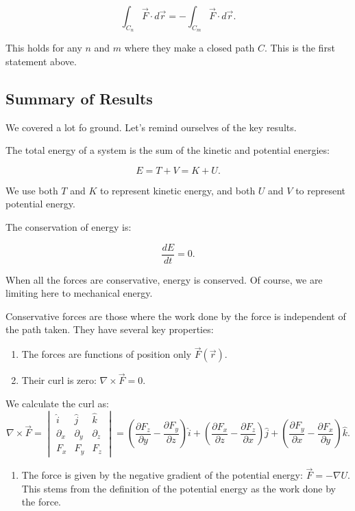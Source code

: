 \documentclass[11pt]{article}
\providecommand{\tightlist}{%
      \setlength{\itemsep}{0pt}\setlength{\parskip}{0pt}}
\begin{document}
\[\int_{C_n} \vec{F}\cdot d\vec{r} = -\int_{C_m} \vec{F}\cdot d\vec{r}.\]

This holds for any \(n\) and \(m\) where they make a closed path \(C\).
This is the first statement above.

    \subsection{Summary of Results}\label{summary-of-results}

We covered a lot fo ground. Let's remind ourselves of the key results.

The total energy of a system is the sum of the kinetic and potential
energies:

\[E = T + V = K +U.\]

We use both \(T\) and \(K\) to represent kinetic energy, and both \(U\)
and \(V\) to represent potential energy.

The conservation of energy is:

\[\dfrac{dE}{dt} = 0.\]

When all the forces are conservative, energy is conserved. Of course, we
are limiting here to mechanical energy.

Conservative forces are those where the work done by the force is
independent of the path taken. They have several key properties:

\begin{enumerate}
\def\labelenumi{\arabic{enumi}.}
\tightlist
\item
  The forces are functions of position only \(\vec{F}(\vec{r})\).
\item
  Their curl is zero: \(\nabla \times \vec{F} = 0\).
\end{enumerate}

We calculate the curl as:
\[\nabla \times \vec{F} = \begin{vmatrix}\hat{i} & \hat{j} & \hat{k} \\ \partial_x & \partial_y & \partial_z \\ F_x & F_y & F_z \end{vmatrix} = \left(\dfrac{\partial F_z}{\partial y} - \dfrac{\partial F_y}{\partial z}\right)\hat{i} + \left(\dfrac{\partial F_x}{\partial z} - \dfrac{\partial F_z}{\partial x}\right)\hat{j} + \left(\dfrac{\partial F_y}{\partial x} - \dfrac{\partial F_x}{\partial y}\right)\hat{k}.\]

\begin{enumerate}
\def\labelenumi{\arabic{enumi}.}
\setcounter{enumi}{2}
\tightlist
\item
  The force is given by the negative gradient of the potential energy:
  \(\vec{F} = -\nabla U\). This stems from the definition of the
  potential energy as the work done by the force.
\end{enumerate}
\end{document}
